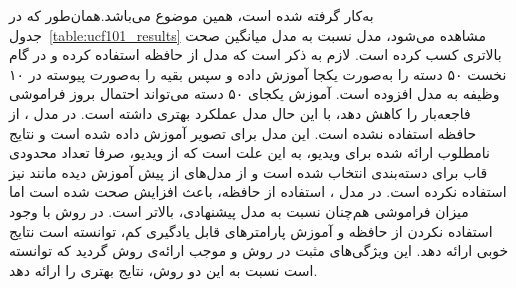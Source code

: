  به‌کار گرفته شده است، همین موضوع می‌باشد.همان‌طور که در جدول~\ref{table:ucf101_results} مشاهده می‌شود، مدل  نسبت به مدل  میانگین صحت بالاتری کسب کرده است. لازم به ذکر است که مدل  از حافظه استفاده کرده و در گام نخست ۵۰ دسته را به‌صورت یکجا آموزش داده و سپس بقیه را به‌صورت پیوسته در ۱۰ وظیفه به مدل افزوده است. آموزش یکجای ۵۰ دسته می‌تواند احتمال بروز فراموشی فاجعه‌بار را کاهش دهد، با این حال مدل  عملکرد بهتری داشته است. در مدل ، از حافظه استفاده نشده است. این مدل برای تصویر آموزش داده شده است و نتایج نامطلوب ارائه شده برای ویدیو، به این علت است که از ویدیو، صرفا تعداد محدودی قاب برای دسته‌بندی انتخاب شده است و از مدل‌های از پیش آموزش دیده مانند  نیز استفاده نکرده است. در مدل ، استفاده از حافظه، باعث افزایش صحت شده است اما میزان فراموشی هم‌چنان نسبت به مدل پیشنهادی، بالاتر است. در روش  با وجود استفاده نکردن از حافظه و آموزش پارامترهای قابل یادگیری کم، توانسته است نتایج خوبی ارائه دهد. این ویژگی‌های مثبت در روش  و  موجب ارائه‌ی روش 
 گردید که توانسته است نسبت به این دو روش، نتایج بهتری را ارائه دهد.
 
